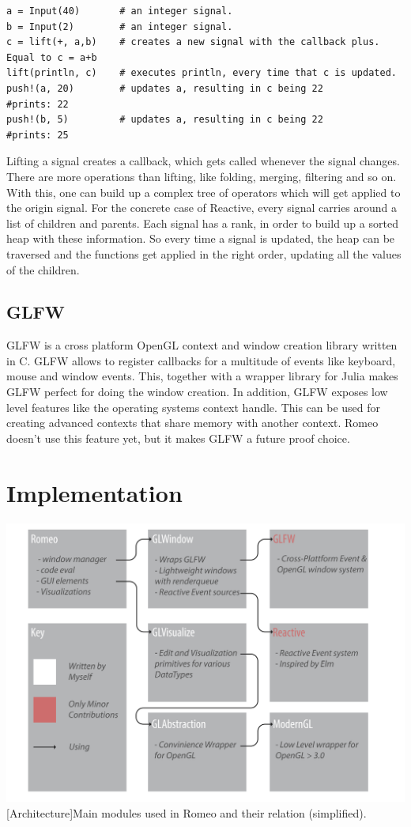 \begin{lstlisting}
a = Input(40)       # an integer signal.
b = Input(2)        # an integer signal.
c = lift(+, a,b)    # creates a new signal with the callback plus. Equal to c = a+b
lift(println, c)    # executes println, every time that c is updated. 
push!(a, 20)        # updates a, resulting in c being 22
#prints: 22
push!(b, 5)         # updates a, resulting in c being 22
#prints: 25
\end{lstlisting}

Lifting a signal creates a callback, which gets called whenever the signal changes.
There are more operations than lifting, like folding, merging, filtering and so on.
With this, one can build up a complex tree of operators which will get applied to the origin signal.
For the concrete case of Reactive, every signal carries around a list of children and parents.
Each signal has a rank, in order to build up a sorted heap with these information.
So every time a signal is updated, the heap can be traversed and the functions get applied in the right order, updating all the values of the children.

\subsection{GLFW}
GLFW is a cross platform \ac{OpenGL} context and window creation library written in C.
GLFW allows to register callbacks for a multitude of events like keyboard, mouse and window events.
This, together with a wrapper library for Julia makes GLFW perfect for doing the window creation.
In addition, GLFW exposes low level features like the operating systems context handle.
This can be used for creating advanced contexts that share memory with another context.
Romeo doesn't use this feature yet, but it makes GLFW a future proof choice.


\section{Implementation}


\vspace{1em}
\begin{minipage}{\linewidth}
    \centering
    \includegraphics[width=0.9\linewidth]{graphics/architecture.pdf}
    [Architecture]{Main modules used in Romeo and their relation (simplified).}
    \label{fig:architecture} 
\end{minipage}


